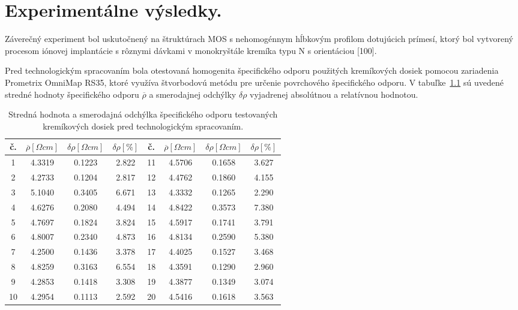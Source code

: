 \chapter{Experimentálne výsledky.}\label{Chapter7}

Záverečný experiment bol uskutočnený na štruktúrach MOS s nehomogénnym
hĺbkovým profilom dotujúcich prímesí, ktorý bol vytvorený procesom
iónovej implantácie s rôznymi dávkami v monokryštále kremíka typu N s
orientáciou [100].

Pred technologickým spracovaním bola otestovaná homogenita
špecifického odporu použitých kremíkových dosiek pomocou zariadenia
Prometrix OmniMap RS35, ktoré využíva štvorbodovú metódu pre určenie
povrchového špecifického odporu. V tabuľke~\ref{tab:7.1} sú uvedené
stredné hodnoty špecifického odporu $\overline\rho$ a smerodajnej
odchýlky $\delta\rho$ vyjadrenej absolútnou a relatívnou hodnotou.

\begin{table}[h!]\centering
  \begin{minipage}[c]{\myfiguresize}
    \begin{center}
      \begin{tabular}{c c c c c c c c}
        č. & $\overline\rho[\Omega cm]$ & $\delta\rho[\Omega cm]$ & $\delta\rho[\%]$ &
        č. & $\overline\rho[\Omega cm]$ & $\delta\rho[\Omega cm]$ & $\delta\rho[\%]$\\
        \hline%
        1  & 4.3319 & 0.1223 & 2.822 & 11 & 4.5706 & 0.1658 & 3.627\\
        2  & 4.2733 & 0.1204 & 2.817 & 12 & 4.4762 & 0.1860 & 4.155\\
        3  & 5.1040 & 0.3405 & 6.671 & 13 & 4.3332 & 0.1265 & 2.290\\
        4  & 4.6276 & 0.2080 & 4.494 & 14 & 4.8422 & 0.3573 & 7.380\\
        5  & 4.7697 & 0.1824 & 3.824 & 15 & 4.5917 & 0.1741 & 3.791\\
        6  & 4.8007 & 0.2340 & 4.873 & 16 & 4.8134 & 0.2590 & 5.380\\
        7  & 4.2500 & 0.1436 & 3.378 & 17 & 4.4025 & 0.1527 & 3.468\\
        8  & 4.8259 & 0.3163 & 6.554 & 18 & 4.3591 & 0.1290 & 2.960\\
        9  & 4.2853 & 0.1418 & 3.308 & 19 & 4.3877 & 0.1349 & 3.074\\
        10 & 4.2954 & 0.1113 & 2.592 & 20 & 4.5416 & 0.1618 & 3.563\\
      \end{tabular}
    \end{center}
    \caption[Stredná hodnota a smerodajná odchýlka špecifického odporu
      testovaných kremíkových dosiek pred technologickým
      spracovaním]{Stredná hodnota a smerodajná odchýlka špecifického
      odporu testovaných kremíkových dosiek pred technologickým
      spracovaním.}\label{tab:7.1}
  \end{minipage}
\end{table}

